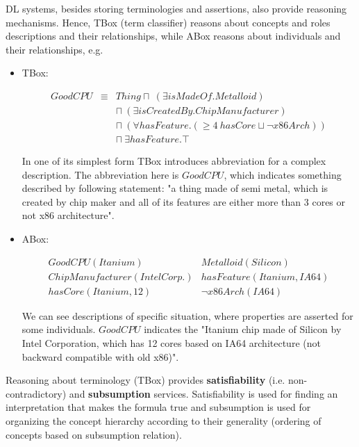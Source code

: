 DL systems, besides storing terminologies and assertions, also provide reasoning mechanisms. Hence, TBox (term classifier) reasons about concepts and roles descriptions and their relationships, while ABox reasons about individuals and their relationships, e.g.
\begin{itemize}
    \item TBox:

\[
\begin{array}{lcl} 
	\mathit{GoodCPU}    & \equiv    & \mathit{Thing} \sqcap~ (\exists \mathit{isMadeOf}.\mathit{Metalloid}) \\ 
                        &           & \sqcap~ (\exists \mathit{isCreatedBy}.\mathit{ChipManufacturer}) \\
                        &           & \sqcap~ (\forall \mathit{hasFeature}.(\geq 4~ \mathit{hasCore} \sqcup \lnot \mathit{x86Arch})) \\
                        &           & \sqcap~ \exists \mathit{hasFeature}.\top
\end{array}
\]

In one of its simplest form TBox introduces abbreviation for a complex description. The abbreviation here is $\mathit{GoodCPU}$, which indicates something described by following statement: "a thing made of semi metal, which is created by chip maker and all of its features are either more than 3 cores or not x86 architecture".

\newpage
    \item ABox:

\[
\begin{array}{ll} 
    \mathit{GoodCPU}(\mathit{Itanium})              & \mathit{Metalloid}(\mathit{Silicon}) \\
    \mathit{ChipManufacturer}(\mathit{Intel Corp.}) & \mathit{hasFeature}(\mathit{Itanium}, \mathit{IA64}) \\
    \mathit{hasCore}(\mathit{Itanium}, 12)          & \lnot \mathit{x86Arch}(\mathit{IA64})
\end{array}
\]

We can see descriptions of specific situation, where properties are asserted for some individuals. $\mathit{GoodCPU}$ indicates the "Itanium chip made of Silicon by Intel Corporation, which has 12 cores based on IA64 architecture (not backward compatible with old x86)".

\end{itemize}

\noindent Reasoning about terminology (TBox) provides \textbf{satisfiability} (i.e. non-contradictory) and \textbf{subsumption} services. Satisfiability is used for finding an interpretation that makes the formula true and subsumption is used for organizing the concept hierarchy according to their generality (ordering of concepts based on subsumption relation). 

